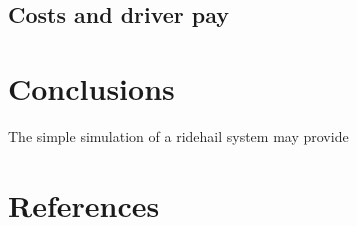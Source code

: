 \documentclass[
  letterpaper,
  DIV=11,
  numbers=noendperiod]{scrartcl}
\begin{document}
\hypertarget{costs-and-driver-pay}{%
\subsection{Costs and driver pay}\label{costs-and-driver-pay}}

\hypertarget{conclusions}{%
\section{Conclusions}\label{conclusions}}

The simple simulation of a ridehail system may provide

\hypertarget{references}{%
\section*{References}\label{references}}
\end{document}
